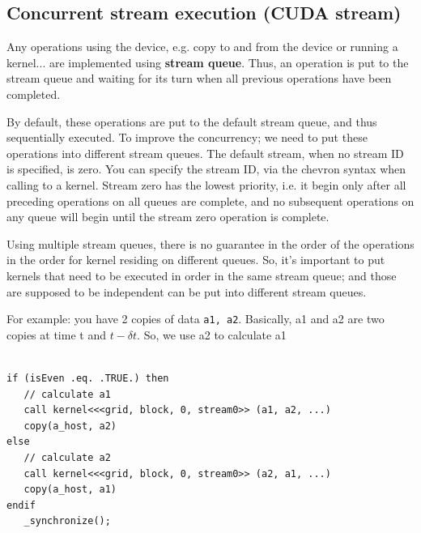 \subsection{Concurrent stream execution (CUDA stream)}
\label{sec:conc-stre-exec}

Any operations using the device, e.g. copy to and from the device or
running a kernel... are implemented using {\bf stream queue}. Thus, an
operation is put to the stream queue and waiting for its turn when all
previous operations have been completed.

By default, these operations are put to the default stream queue, and
thus sequentially executed. To improve the concurrency; we need to put
these operations into different stream queues. The default stream,
when no stream ID is specified, is zero. You can specify the stream
ID, via the chevron syntax when calling to a kernel. Stream zero has
the lowest priority, i.e. it begin only after all preceding operations
on all queues are complete, and no subsequent operations on any queue
will begin until the stream zero operation is complete.

Using multiple stream queues, there is no guarantee in the order of
the operations in the order for kernel residing on different
queues. So, it's important to put kernels that need to be executed in
order in the same stream queue; and those are supposed to be
independent can be put into different stream queues. 

For example: you have 2 copies of data \verb!a1, a2!. Basically, a1
and a2 are two copies at time t and $t-\delta t$. So, we use a2 to
calculate a1
\begin{lstlisting}

if (isEven .eq. .TRUE.) then 
   // calculate a1 
   call kernel<<<grid, block, 0, stream0>> (a1, a2, ...)
   copy(a_host, a2)
else 
   // calculate a2 
   call kernel<<<grid, block, 0, stream0>> (a2, a1, ...)
   copy(a_host, a1)
endif   
   _synchronize();
\end{lstlisting}







